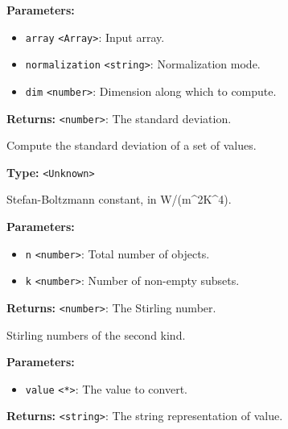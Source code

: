 \documentclass[12pt,a4paper]{article}
\begin{document}
\noindent \textbf{Parameters:}
\begin{itemize}
  \item \texttt{array} \texttt{<Array>}: Input array.
  \item \texttt{normalization} \texttt{<string>}: Normalization mode.
  \item \texttt{dim} \texttt{<number>}: Dimension along which to compute.
\end{itemize}

\noindent \textbf{Returns:} \texttt{<number>}: The standard deviation.

\noindent Compute the standard deviation of a set of values.

\vspace{5mm}
\noindent {}\vspace{4mm}


\noindent \textbf{Type:} \texttt{<Unknown>}

\noindent Stefan-Boltzmann constant, in W/(m\textasciicircum{}2K\textasciicircum{}4).

\vspace{5mm}
\noindent {}


\noindent \textbf{Parameters:}
\begin{itemize}
  \item \texttt{n} \texttt{<number>}: Total number of objects.
  \item \texttt{k} \texttt{<number>}: Number of non-empty subsets.
\end{itemize}

\noindent \textbf{Returns:} \texttt{<number>}: The Stirling number.

\noindent Stirling numbers of the second kind.

\vspace{5mm}
\noindent {}


\noindent \textbf{Parameters:}
\begin{itemize}
  \item \texttt{value} \texttt{<*>}: The value to convert.
\end{itemize}

\noindent \textbf{Returns:} \texttt{<string>}: The string representation of value.
\end{document}
